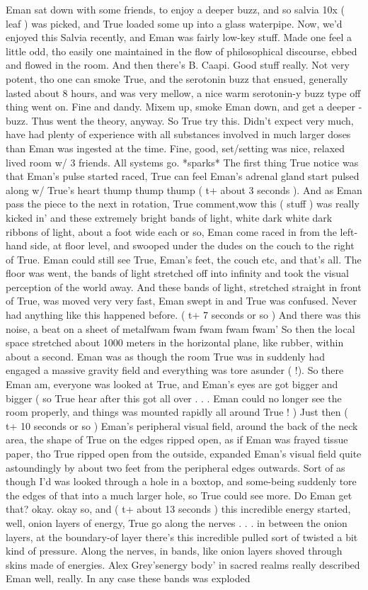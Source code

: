 \documentclass[12pt]{book}
\begin{document}
Eman sat down with some friends, to enjoy a deeper buzz, and so salvia 10x ( leaf ) was picked, and True loaded some up into a glass waterpipe. Now, we'd enjoyed this Salvia recently, and Eman was fairly low-key stuff. Made one feel a little odd, tho easily one maintained in the flow of philosophical discourse, ebbed and flowed in the room. And then there's B. Caapi. Good stuff really. Not very potent, tho one can smoke True, and the serotonin buzz that ensued, generally lasted about 8 hours, and was very mellow, a nice warm serotonin-y buzz type off thing went on. Fine and dandy. Mixem up, smoke Eman down, and get a deeper - buzz. Thus went the theory, anyway. So True try this. Didn't expect very much, have had plenty of experience with all substances involved in much larger doses than Eman was ingested at the time. Fine, good, set/setting was nice, relaxed lived room w/ 3 friends. All systems go. *sparks* The first thing True notice was that Eman's pulse started raced, True can feel Eman's adrenal gland start pulsed along w/ True's heart thump thump thump (  t+ about 3 seconds ). And as Eman pass the piece to the next in rotation, True comment,wow this ( stuff ) was really kicked in' and these extremely bright bands of light, white dark white dark ribbons of light, about a foot wide each or so, Eman come raced in from the left-hand side, at floor level, and swooped under the dudes on the couch to the right of True. Eman could still see True, Eman's feet, the couch etc, and that's all. The floor was went, the bands of light stretched off into infinity and took the visual perception of the world away. And these bands of light, stretched straight in front of True, was moved very very fast, Eman swept in and True was confused. Never had anything like this happened before. (  t+ 7 seconds or so ) And there was this noise, a beat on a sheet of metalfwam fwam fwam fwam fwam' So then the local space stretched about 1000 meters in the horizontal plane, like rubber, within about a second. Eman was as though the room True was in suddenly had engaged a massive gravity field and everything was tore asunder ( !). So there Eman am, everyone was looked at True, and Eman's eyes are got bigger and bigger ( so True hear after this got all over . . .  Eman could no longer see the room properly, and things was mounted rapidly all around True !  ) Just then (  t+ 10 seconds or so ) Eman's peripheral visual field, around the back of the neck area, the shape of True on the edges ripped open, as if Eman was frayed tissue paper, tho True ripped open from the outside, expanded Eman's visual field quite astoundingly by about two feet from the peripheral edges outwards. Sort of as though I'd was looked through a hole in a boxtop, and some-being suddenly tore the edges of that into a much larger hole, so True could see more. Do Eman get that? okay. okay so, and (  t+ about 13 seconds  ) this incredible energy started, well, onion layers of energy, True go along the nerves . . .  in between the onion layers, at the boundary-of layer there's this incredible pulled sort of twisted a bit kind of pressure. Along the nerves, in bands, like onion layers shoved through skins made of energies. Alex Grey'senergy body' in sacred realms really described Eman well, really. In any case these bands was exploded 
\end{document}
